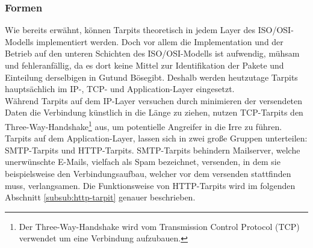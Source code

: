 \subsubsection{Formen}
Wie bereits erwähnt, können Tarpits theoretisch in jedem Layer des ISO/OSI-Modells implementiert werden. Doch vor allem die Implementation und der Betrieb auf den unteren Schichten des ISO/OSI-Modells ist aufwendig, mühsam und fehleranfällig, da es dort keine Mittel zur Identifikation der Pakete und Einteilung derselbigen in \glqq Gut\grqq\space und \glqq Böse\grqq\space gibt. Deshalb werden heutzutage Tarpits hauptsächlich im IP-, TCP- und Application-Layer eingesetzt.\\
Während Tarpits auf dem IP-Layer versuchen durch minimieren der versendeten Daten die Verbindung künstlich in die Länge zu ziehen, nutzen TCP-Tarpits den Three-Way-Handshake\footnote{Der Three-Way-Handshake wird vom Transmission Control Protocol (TCP) verwendet um eine Verbindung aufzubauen.} aus, um potentielle Angreifer in die Irre zu führen. Tarpits auf dem Application-Layer, lassen sich in zwei große Gruppen unterteilen: SMTP-Tarpits und HTTP-Tarpits. SMTP-Tarpits behindern Mailserver, welche unerwünschte E-Mails, vielfach als Spam bezeichnet, versenden, in dem sie beispielsweise den Verbindungsaufbau, welcher vor dem versenden stattfinden muss, verlangsamen\cite{tarpit-smtp}. Die Funktionsweise von HTTP-Tarpits wird im folgenden Abschnitt \ref{subsub:http-tarpit} genauer beschrieben.
